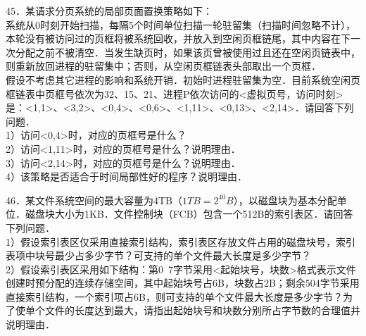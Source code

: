 45．某请求分页系统的局部页面置换策略如下：\\
系统从0时刻开始扫描，每隔5个时间单位扫描一轮驻留集（扫描时间忽略不计），本轮没有被访问过的页框将被系统回收，并放入到空闲页框链尾，其中内容在下一次分配之前不被清空．当发生缺页时，如果该页曾被使用过且还在空闲页链表中，则重新放回进程的驻留集中；否则，从空闲页框链表头部取出一个页框．\\

假设不考虑其它进程的影响和系统开销．初始时进程驻留集为空．目前系统空闲页框链表中页框号依次为32、15、21、进程P依次访问的<虚拟页号，访问时刻>是：<1,1>、<3,2>、<0,4>、<0,6>、<1,11>、<0,13>、<2,14>．请回答下列问题．\\
1）访问<0,4>时，对应的页框号是什么？\\
2）访问<1,11>时，对应的页框号是什么？说明理由．\\
3）访问<2,14>时，对应的页框号是什么？说明理由．\\
4）该策略是否适合于时间局部性好的程序？说明理由．

46．某文件系统空间的最大容量为4TB（$1TB=2^{40}B$），以磁盘块为基本分配单位．磁盘块大小为1KB．文件控制块（FCB）包含一个512B的索引表区．请回答下列问题． \\
1）假设索引表区仅采用直接索引结构，索引表区存放文件占用的磁盘块号，索引表项中块号最少占多少字节？可支持的单个文件最大长度是多少字节？ \\
2）假设索引表区采用如下结构：第0~7字节采用<起始块号，块数>格式表示文件创建时预分配的连续存储空间，其中起始块号占6B，块数占2B；剩余504字节采用直接索引结构，一个索引项占6B，则可支持的单个文件最大长度是多少字节？为了使单个文件的长度达到最大，请指出起始块号和块数分别所占字节数的合理值并说明理由．

